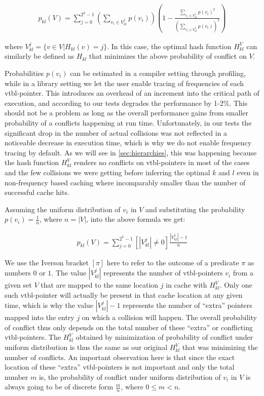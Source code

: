 \begin{eqnarray*}
p_{kl}(V)=\sum\limits_{j=0}^{2^k-1}(\sum\limits_{v_{i} \in V^j_{kl}}p(v_i))(1-\frac{\sum\limits_{v_i \in V^j_{kl}}p(v_i)^2}{(\sum\limits_{v_{i} \in V^j_{kl}}p(v_i))^2})
\end{eqnarray*}

\noindent 
where $V^j_{kl}=\{v \in V | H_{kl}(v)=j\}$. In this case, the optimal hash 
function $H_{kl}^V$ can similarly be defined as $H_{kl}$ that minimizes the 
above probability of conflict on $V$.

Probabilities $p(v_i)$ can be estimated in a compiler setting through profiling, 
while in a library setting we let the user enable tracing of frequencies of 
each vtbl-pointer. This introduces an overhead of an increment into the critical 
path of execution, and according to our tests degrades the performance by 1-2\%. 
This should not be a problem as long as the overall performance gains from 
smaller probability of a conflicts happening at run time. Unfortunately, in our 
tests the significant drop in the number of actual collisions was not reflected 
in a noticeable decrease in execution time, which is why we do not enable 
frequency tracing by default. As we will see in \textsection\ref{sec:hierarchies}, 
this was happening because the hash function $H_{kl}^V$ renders no conflicts on 
vtbl-pointers in most of the cases and the few collisions we were getting before 
inferring the optimal $k$ and $l$ even in non-frequency based caching where 
incomparably smaller than the number of successful cache hits.

Assuming the uniform distribution of $v_i$ in $V$ and substituting the probability 
$p(v_i)=\frac{1}{n}$, where $n=|V|$, into the above formula we get:

\begin{eqnarray*}
p_{kl}(V)=\sum\limits_{j=0}^{2^k-1}[|V^j_{kl}| \neq 0]\frac{|V^j_{kl}|-1}{n}
\end{eqnarray*}

\noindent
We use the Iverson bracket $[\pi]$ here to refer to the outcome of a predicate $\pi$ as numbers $0$ or $1$.
The value $|V^j_{kl}|$ represents the number of vtbl-pointers $v_i$ from a given 
set $V$ that are mapped to the same location $j$ in cache with $H_{kl}^V$. Only 
one such vtbl-pointer will actually be present in that cache location at any given 
time, which is why the value $|V^j_{kl}|-1$ represents the number of ``extra'' 
pointers mapped into the entry $j$ on which a collision will happen. The overall 
probability of conflict thus only depends on the total number of these ``extra'' 
or conflicting vtbl-pointers. The $H_{kl}^V$ obtained by minimization of 
probability of conflict under uniform distribution is thus the same as our 
original $H_{kl}^V$ that was minimizing the number of conflicts. An important 
observation here is that since the exact location of these ``extra'' 
vtbl-pointers is not important and only the total number $m$ is, the probability 
of conflict under uniform distribution of $v_i$ in $V$ is always going to be of 
discrete form $\frac{m}{n}$, where $0 \le m < n$.

